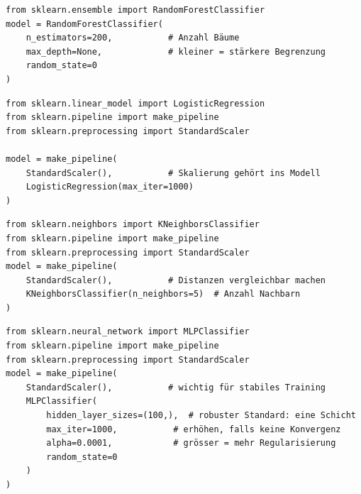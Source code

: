 \begin{codebox}[RandomForestClassifier]
\begin{lstlisting}[style=CodeExpert]
from sklearn.ensemble import RandomForestClassifier
model = RandomForestClassifier(
    n_estimators=200,           # Anzahl Bäume
    max_depth=None,             # kleiner = stärkere Begrenzung
    random_state=0
)
\end{lstlisting}
\end{codebox}

\begin{codebox}
\begin{lstlisting}[style=CodeExpert]
from sklearn.linear_model import LogisticRegression
from sklearn.pipeline import make_pipeline
from sklearn.preprocessing import StandardScaler

model = make_pipeline(
    StandardScaler(),           # Skalierung gehört ins Modell
    LogisticRegression(max_iter=1000)
)
\end{lstlisting}
\end{codebox}

\begin{codebox}
\begin{lstlisting}[style=CodeExpert]
from sklearn.neighbors import KNeighborsClassifier
from sklearn.pipeline import make_pipeline
from sklearn.preprocessing import StandardScaler
model = make_pipeline(
    StandardScaler(),           # Distanzen vergleichbar machen
    KNeighborsClassifier(n_neighbors=5)  # Anzahl Nachbarn
)
\end{lstlisting}
\end{codebox}

\begin{codebox}
\begin{lstlisting}[style=CodeExpert]
from sklearn.neural_network import MLPClassifier
from sklearn.pipeline import make_pipeline
from sklearn.preprocessing import StandardScaler
model = make_pipeline(
    StandardScaler(),           # wichtig für stabiles Training
    MLPClassifier(
        hidden_layer_sizes=(100,),  # robuster Standard: eine Schicht
        max_iter=1000,           # erhöhen, falls keine Konvergenz
        alpha=0.0001,            # grösser = mehr Regularisierung
        random_state=0
    )
)
\end{lstlisting}
\end{codebox}


